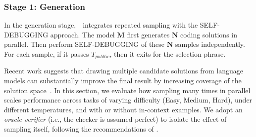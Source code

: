 
\subsubsection{Stage 1: Generation}
\label{sec:scale_parallel_samples}
In the generation stage,~\frameworkname~integrates repeated sampling with the SELF-DEBUGGING approach. The model $\mathbf{M}$ first generates $\mathbf{N}$ coding solutions in parallel. Then perform SELF-DEBUGGING of these $\mathbf{N}$ samples independently. For each sample, if it passes $T_{publlic}$, then it exits for the selection phrase.








Recent work suggests that drawing multiple candidate solutions from language models can substantially improve the final result by increasing coverage of the solution space~\citep{brown2024large, li2022competition}. In this section, we evaluate how sampling many times in parallel scales performance across tasks of varying difficulty (Easy, Medium, Hard), under different temperatures, and with or without in-context examples. 
We adopt an \textit{oracle verifier} (i.e., the checker is assumed perfect) to isolate the effect of sampling itself, following the recommendations of \citet{stroebl2024inference}.

